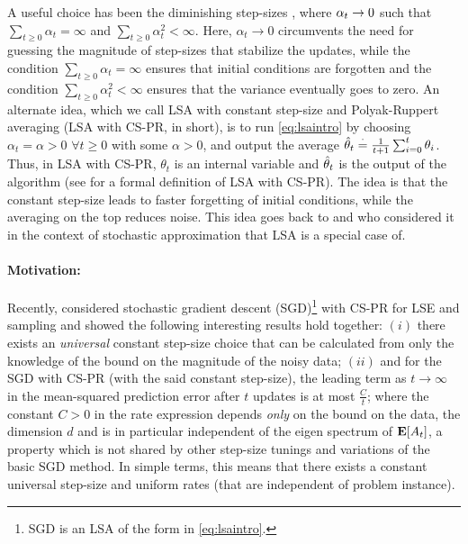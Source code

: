 A useful choice has been the diminishing step-sizes \cite{gtd2,gtdmp,konda-tsitsiklis}, where $\alpha_t\rightarrow 0$ such that $\sum_{t\geq 0} \alpha_t=\infty$ and $\sum_{t\geq 0} \alpha^2_t<\infty$. Here, $\alpha_t\to0$ circumvents the need for guessing the magnitude of step-sizes that stabilize the updates, while the condition $\sum_{t\geq 0} \alpha_t=\infty$ ensures that initial conditions are forgotten and the condition  $\sum_{t\geq 0} \alpha^2_t<\infty$ ensures that the variance eventually goes to zero.  An alternate idea, which we call LSA with constant step-size and Polyak-Ruppert averaging (LSA with CS-PR, in short), is to run \eqref{eq:lsaintro} by choosing $\alpha_t=\alpha>0$ $\forall t\geq 0$ with some $\alpha>0$, and output the average $\hat{\theta}_t\stackrel{\cdot}{=}\frac{1}{t+1}\sum_{i=0}^t \theta_i$. Thus, in LSA with CS-PR, $\theta_t$ is an internal variable and $\hat{\theta}_t$ is the output of the algorithm (see  for a formal definition of LSA with CS-PR). The idea is that the constant step-size leads to faster forgetting of initial conditions, while the averaging on the top reduces noise. This idea goes back to  \citet{ruppert} and \citet{polyak-judisky} who considered it in the context of stochastic approximation that LSA is a special case of. 
\paragraph{Motivation:} Recently, \citet{bach} considered stochastic gradient descent (SGD)\footnote{SGD is an LSA of the form in \eqref{eq:lsaintro}.} with CS-PR for LSE and \iid sampling and showed the following interesting results hold together: $(i)$ there exists an \emph{universal} constant step-size choice that can be calculated from only the knowledge of the bound on the magnitude of the noisy data; $(ii)$ and for the SGD with CS-PR (with the said constant step-size), the leading term as $t\to\infty$
 in the mean-squared prediction error after $t$ updates is at most $\frac{C}{t}$; where the constant $C>0$ in the rate expression depends \emph{only} on the bound on the data, the dimension $d$ and is in particular independent of the eigen spectrum of $\mathbf{E}[A_t]$, a property which is not shared by other step-size tunings and variations of the basic SGD method. In simple terms, this means that there exists a constant universal step-size  and uniform rates (that are independent of problem instance).
